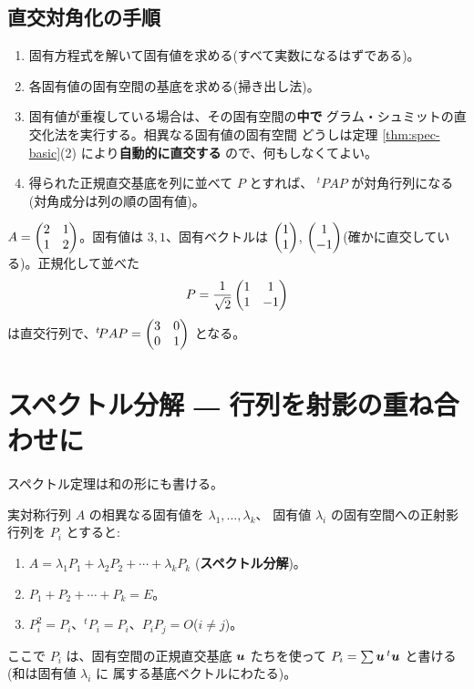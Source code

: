 \subsection*{直交対角化の手順}

\begin{enumerate}
\item 固有方程式を解いて固有値を求める(すべて実数になるはずである)。
\item 各固有値の固有空間の基底を求める(掃き出し法)。
\item 固有値が重複している場合は、その固有空間の\textbf{中で}
グラム・シュミットの直交化法を実行する。相異なる固有値の固有空間
どうしは定理 \ref{thm:spec-basic}(2) により\textbf{自動的に直交する}
ので、何もしなくてよい。
\item 得られた正規直交基底を列に並べて $P$ とすれば、
${}^t\!PAP$ が対角行列になる(対角成分は列の順の固有値)。
\end{enumerate}

\begin{rei}\label{rei:spec-2x2}
$A = \begin{pmatrix}2 & 1 \\ 1 & 2\end{pmatrix}$。固有値は $3, 1$、固有ベクトルは
$\begin{pmatrix}1 \\ 1\end{pmatrix}$, $\begin{pmatrix}1 \\ -1\end{pmatrix}$(確かに直交している)。正規化して並べた
\[
P = \frac{1}{\sqrt{2}}\begin{pmatrix}1 & 1 \\ 1 & -1\end{pmatrix}
\]
は直交行列で、${}^t\!PAP = \begin{pmatrix}3 & 0 \\ 0 & 1\end{pmatrix}$ となる。
\end{rei}

\section{スペクトル分解 ― 行列を射影の重ね合わせに}

スペクトル定理は和の形にも書ける。

\begin{teiri}[スペクトル分解]\label{thm:spec-decomp}
実対称行列 $A$ の相異なる固有値を $\lambda_1, \dots, \lambda_k$、
固有値 $\lambda_i$ の固有空間への正射影行列を $P_i$ とすると:
\begin{enumerate}
\item $A = \lambda_1 P_1 + \lambda_2 P_2 + \cdots + \lambda_k P_k$
(\textbf{スペクトル分解})。
\item $P_1 + P_2 + \cdots + P_k = E$。
\item $P_i^2 = P_i$、${}^t\!P_i = P_i$、$P_iP_j = O$($i \neq j$)。
\end{enumerate}
ここで $P_i$ は、固有空間の正規直交基底 $\bm{u}$ たちを使って
$P_i = \sum \bm{u}\,{}^t\bm{u}$ と書ける(和は固有値 $\lambda_i$ に
属する基底ベクトルにわたる)。
\end{teiri}

